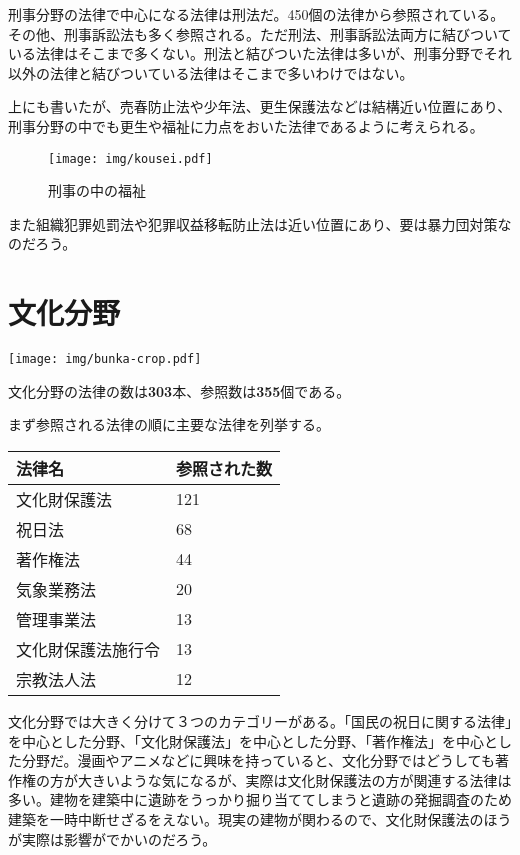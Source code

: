 \documentclass[a5j,openany,twoside]{jsbook}
\begin{document}
刑事分野の法律で中心になる法律は刑法だ。450個の法律から参照されている。その他、刑事訴訟法も多く参照される。ただ刑法、刑事訴訟法両方に結びついている法律はそこまで多くない。刑法と結びついた法律は多いが、刑事分野でそれ以外の法律と結びついている法律はそこまで多いわけではない。

上にも書いたが、売春防止法や少年法、更生保護法などは結構近い位置にあり、刑事分野の中でも更生や福祉に力点をおいた法律であるように考えられる。

\begin{wrapfigure}{l}{35mm}
 \begin{center}
  \texttt{[image: img/kousei.pdf]}
  \caption{刑事の中の福祉}
 \end{center}
\end{wrapfigure}

また組織犯罪処罰法や犯罪収益移転防止法は近い位置にあり、要は暴力団対策なのだろう。

\section{文化分野}

\texttt{[image: img/bunka-crop.pdf]}

文化分野の法律の数は\textbf{303}本、参照数は\textbf{355}個である。

まず参照される法律の順に主要な法律を列挙する。

\begin{table}[htb]
  \begin{tabular}{|l|l|}  \hline
法律名 & 参照された数 \\ \hline \hline
文化財保護法 & 121 \\
祝日法 & 68 \\
著作権法 & 44 \\
気象業務法 & 20 \\
管理事業法 & 13 \\
文化財保護法施行令 & 13 \\
宗教法人法 & 12 \\ \hline
  \end{tabular}
\end{table}

文化分野では大きく分けて３つのカテゴリーがある。「国民の祝日に関する法律」を中心とした分野、「文化財保護法」を中心とした分野、「著作権法」を中心とした分野だ。漫画やアニメなどに興味を持っていると、文化分野ではどうしても著作権の方が大きいような気になるが、実際は文化財保護法の方が関連する法律は多い。建物を建築中に遺跡をうっかり掘り当ててしまうと遺跡の発掘調査のため建築を一時中断せざるをえない。現実の建物が関わるので、文化財保護法のほうが実際は影響がでかいのだろう。
\end{document}
